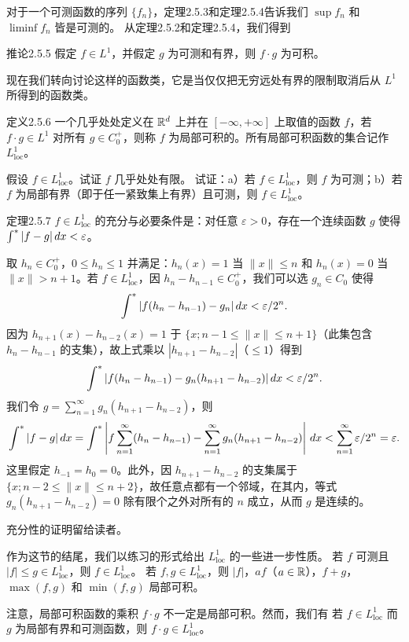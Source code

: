 对于一个可测函数的序列 $\{f_n\}$，定理2.5.3和定理2.5.4告诉我们 $\sup f_n$ 和 $\liminf f_n$ 皆是可测的。
从定理2.5.2和定理2.5.4，我们得到
\begin{statement}{推论}{2.5.5}
假定 $f\in L^1$，并假定 $g$ 为可测和有界，则 $f\cdot g$ 为可积。
\end{statement}
现在我们转向讨论这样的函数类，它是当仅仅把无穷远处有界的限制取消后从 $L^1$ 所得到的函数类。
\begin{statement}{定义}{2.5.6}
一个几乎处处定义在 $\mathbb R^d$ 上并在 $[-\infty,+\infty]$ 上取值的函数 $f$，若 $f\cdot g\in L^1$ 对所有 $g\in C_0^+$，则称 $f$ 为局部可积的。所有局部可积函数的集合记作 $L^1_{\mathrm{loc}}$。
\end{statement}
\Exercise 假设 $f\in L^1_{\mathrm{loc}}$。试证 $f$ 几乎处处有限。
\Exercise 试证：a）若 $f\in L^1_{\mathrm{loc}}$，则 $f$ 为可测；b）若 $f$ 为局部有界（即于任一紧致集上有界）且可测，则 $f\in L^1_{\mathrm{loc}}$。
\begin{statement}{定理}{2.5.7}
$f\in L^1_{\mathrm{loc}}$ 的充分与必要条件是：对任意 $\varepsilon>0$，存在一个连续函数 $g$ 使得 $\int^{*}|f-g|\,dx<\varepsilon$。
\end{statement}
\Proof 取 $h_n\in C_0^+$，$0\le h_n\le1$ 并满足：$h_n(x)=1$ 当 $\|x\|\le n$ 和 $h_n(x)=0$ 当 $\|x\|>n+1$。若 $f\in L^1_{\mathrm{loc}}$，因 $h_n-h_{n-1}\in C_0^+$，我们可以选 $g_n\in C_0$ 使得
\[\int^{*}|f(h_n-h_{n-1})-g_n|\,dx<\varepsilon/2^n.\]
因为 $h_{n+1}(x)-h_{n-2}(x)=1$ 于 $\{x;n-1\le\|x\|\le n+1\}$（此集包含 $h_n-h_{n-1}$ 的支集），故上式乘以 $|h_{n+1}-h_{n-2}|$（$\le1$）得到
\[\int^{*}|f(h_n-h_{n-1})-g_n(h_{n+1}-h_{n-2})|\,dx<\varepsilon/2^n.\]
我们令 $g=\sum_{n=1}^\infty g_n(h_{n+1}-h_{n-2})$，则
\[\int^{*}|f-g|\,dx=\int^{*}\left|f\sum_{n=1}^\infty(h_n-h_{n-1})-\sum_{n=1}^\infty g_n(h_{n+1}-h_{n-2})\right|\,dx<\sum_{n=1}^\infty\varepsilon/2^n=\varepsilon.\]
这里假定 $h_{-1}=h_0=0$。此外，因 $h_{n+1}-h_{n-2}$ 的支集属于 $\{x;n-2\le\|x\|\le n+2\}$，故任意点都有一个邻域，在其内，等式 $g_n(h_{n+1}-h_{n-2})=0$ 除有限个之外对所有的 $n$ 成立，从而 $g$ 是连续的。

充分性的证明留给读者。

作为这节的结尾，我们以练习的形式给出 $L^1_{\mathrm{loc}}$ 的一些进一步性质。
\Exercise 若 $f$ 可测且 $|f|\le g\in L^1_{\mathrm{loc}}$，则 $f\in L^1_{\mathrm{loc}}$。
\Exercise 若 $f,g\in L^1_{\mathrm{loc}}$，则 $|f|$，$af$（$a\in\mathbb R$），$f+g$，$\max(f,g)$ 和 $\min(f,g)$ 局部可积。

注意，局部可积函数的乘积 $f\cdot g$ 不一定是局部可积。然而，我们有
\Exercise 若 $f\in L^1_{\mathrm{loc}}$ 而 $g$ 为局部有界和可测函数，则 $f\cdot g\in L^1_{\mathrm{loc}}$。
